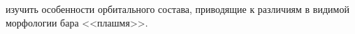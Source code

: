\documentclass{trlnotes}
\begin{document}
изучить особенности орбитального состава, приводящие к различиям в видимой морфологии бара <<плашмя>>.
\end{document}
